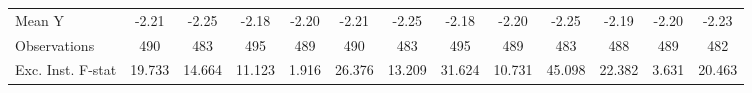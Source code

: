 {\begin{tabular}{l*{12}{c}}
\midrule
Mean Y      &       -2.21         &       -2.25         &       -2.18         &       -2.20         &       -2.21         &       -2.25         &       -2.18         &       -2.20         &       -2.25         &       -2.19         &       -2.20         &       -2.23         \\
Observations&         490         &         483         &         495         &         489         &         490         &         483         &         495         &         489         &         483         &         488         &         489         &         482         \\
Exc. Inst. F-stat&      19.733         &      14.664         &      11.123         &       1.916         &      26.376         &      13.209         &      31.624         &      10.731         &      45.098         &      22.382         &       3.631         &      20.463         \\
\bottomrule
\end{tabular}
}

